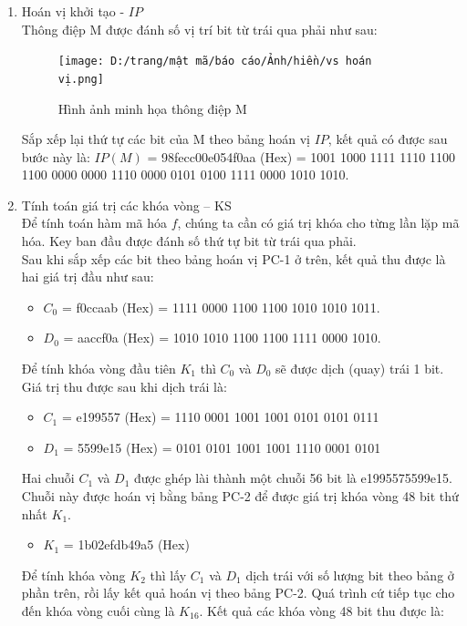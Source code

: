 \begin{enumerate}
    \item Hoán vị khởi tạo - $IP$\\
    Thông điệp M được đánh số vị trí bit từ trái qua phải như sau:
    \begin{figure}[H]
        \centering
        \texttt{[image: D:/trang/mật mã/báo cáo/Ảnh/hiền/vs hoán vị.png]}
        \caption{Hình ảnh minh họa thông điệp M}
    \end{figure}
    Sắp xếp lại thứ tự các bit của M theo bảng hoán vị $IP$, kết quả có được sau bước này là:
    $IP(M)$ = 98fecc00e054f0aa (Hex) = 1001 1000 1111 1110 1100 1100 0000 0000 1110 0000 0101 0100 1111 0000 1010 1010.
    \item Tính toán giá trị các khóa vòng – KS\\
    Để tính toán hàm mã hóa $f$, chúng ta cần có giá trị khóa cho từng lần lặp mã hóa. Key ban đầu được đánh số thứ tự bit từ trái qua phải.\\
    Sau khi sắp xếp các bit theo bảng hoán vị PC-1 ở trên, kết quả thu được là hai giá trị đầu như sau: 
    \begin{itemize}
        \item $C_{0}$ = f0ccaab (Hex) = 1111 0000 1100 1100 1010 1010 1011. 
        \item $D_{0}$ = aaccf0a (Hex) = 1010 1010 1100 1100 1111 0000 1010. 
    \end{itemize}
    Để tính khóa vòng đầu tiên $K_1$ thì $C_0$ và $D_0$ sẽ được dịch (quay) trái 1 bit. Giá trị thu được sau khi dịch trái là: 
    \begin{itemize}
        \item $C_{1}$ = e199557 (Hex) = 1110 0001 1001 1001 0101 0101 0111 
        \item $D_{1}$ = 5599e15 (Hex) = 0101 0101 1001 1001 1110 0001 0101 
    \end{itemize}
    Hai chuỗi $C_{1}$ và $D_{1}$ được ghép lài thành một chuỗi 56 bit là e1995575599e15. Chuỗi này được hoán vị bằng bảng PC-2 để được giá trị khóa vòng 48 bit thứ nhất $K_1$. 
    \begin{itemize}
        \item $K_1$ = 1b02efdb49a5 (Hex) 
    \end{itemize}
    Để tính khóa vòng $K_2$ thì lấy $C_{1}$ và $D_{1}$ dịch trái với số lượng bit theo bảng ở phần trên, rồi lấy kết quả hoán vị theo bảng PC-2. Quá trình cứ tiếp tục cho đến khóa vòng cuối cùng là $K_{16}$. Kết quả các khóa vòng 48 bit thu được là:
    \begin{itemize}

\end{itemize}
\end{enumerate}
